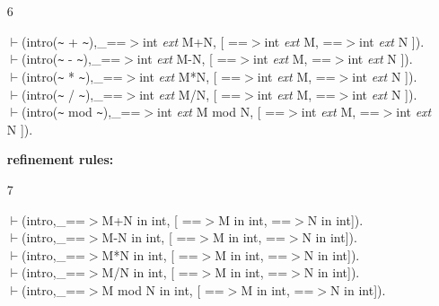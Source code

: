 \documentclass[11pt]{report}
\begin{document}
\begin{enumerate}
 {\bf equality rule:}
 
 \item[6]
\begin{sf}\begin{tabbing}
$\vdash$(intro({\verb`~`} + {\verb`~`}),\_\hspace{0.1em}==$>$int \mbox{\it ext} M+N, [ ==$>$int \mbox{\it ext} M, ==$>$int \mbox{\it ext} N ]).\\[-0.15ex]
$\vdash$(intro({\verb`~`} - {\verb`~`}),\_\hspace{0.1em}==$>$int \mbox{\it ext} M-N, [ ==$>$int \mbox{\it ext} M, ==$>$int \mbox{\it ext} N ]).\\[-0.15ex]
$\vdash$(intro({\verb`~`} * {\verb`~`}),\_\hspace{0.1em}==$>$int \mbox{\it ext} M*N, [ ==$>$int \mbox{\it ext} M, ==$>$int \mbox{\it ext} N ]).\\[-0.15ex]
$\vdash$(intro({\verb`~`} / {\verb`~`}),\_\hspace{0.1em}==$>$int \mbox{\it ext} M/N, [ ==$>$int \mbox{\it ext} M, ==$>$int \mbox{\it ext} N ]).\\[-0.15ex]
$\vdash$(intro({\verb`~`} mod {\verb`~`}),\_\hspace{0.1em}==$>$int \mbox{\it ext} M mod N, [ ==$>$int \mbox{\it ext} M, ==$>$int \mbox{\it ext} N ]).
\end{tabbing}\end{sf}

 {\bf refinement rules:}
  
 \item[7]
\begin{sf}\begin{tabbing}
$\vdash$(intro,\_\hspace{0.1em}==$>$M+N in int, [ ==$>$M in int, ==$>$N in int]).\\[-0.15ex]
$\vdash$(intro,\_\hspace{0.1em}==$>$M-N in int, [ ==$>$M in int, ==$>$N in int]).\\[-0.15ex]
$\vdash$(intro,\_\hspace{0.1em}==$>$M*N in int, [ ==$>$M in int, ==$>$N in int]).\\[-0.15ex]
$\vdash$(intro,\_\hspace{0.1em}==$>$M/N in int, [ ==$>$M in int, ==$>$N in int]).\\[-0.15ex]
$\vdash$(intro,\_\hspace{0.1em}==$>$M mod N in int, [ ==$>$M in int, ==$>$N in int]).
\end{tabbing}\end{sf}


\end{enumerate}
\end{document}
